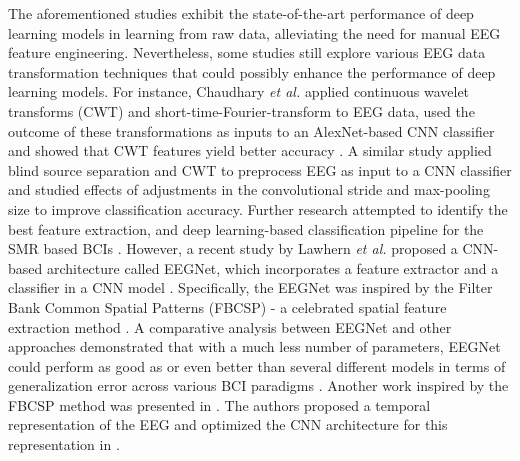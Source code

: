 \documentclass{ieeeaccess}
\begin{document}
The aforementioned studies exhibit the state-of-the-art performance of deep learning models in learning from raw data, alleviating the need for manual EEG feature engineering. Nevertheless, some studies still explore various EEG data transformation techniques that could possibly enhance the performance of deep learning models. For instance, Chaudhary \textit{et al.} \cite{chaudhary2019convolutional} applied continuous wavelet transforms (CWT) and short-time-Fourier-transform to EEG data, used the outcome of these transformations as inputs to an AlexNet-based CNN classifier and showed that CWT features yield better accuracy \cite{krizhevsky2012imagenet}. A similar study \cite{ortiz2019new} applied blind source separation and CWT to preprocess EEG as input to a CNN classifier \cite{zhang2019novelx} and studied effects of adjustments in the convolutional stride and max-pooling size to improve classification accuracy.    
Further research attempted to identify the best feature extraction, and deep learning-based classification pipeline for the SMR based BCIs \cite{craik2019deep, roy2019deep, lotte2018review}. However,  a recent study by Lawhern \textit{et al.} proposed a CNN-based architecture called EEGNet, which incorporates a feature extractor and a classifier in a CNN model \cite{lawhern2016eegnet}. Specifically, the EEGNet was inspired by the Filter Bank Common Spatial Patterns (FBCSP) - a celebrated spatial feature extraction method \cite{angbci, ang2008filter}. A comparative analysis between EEGNet and other approaches demonstrated that with a much less number of parameters, EEGNet could perform as good as or even better than several different models in terms of generalization error across various BCI paradigms \cite{lawhern2016eegnet}. Another work inspired by the FBCSP method was presented in \cite{sakhavi2018learning, zhu2019separated}. The authors proposed a temporal representation of the EEG and optimized the CNN architecture for this representation in \cite{sakhavi2018learning}. 
\end{document}
